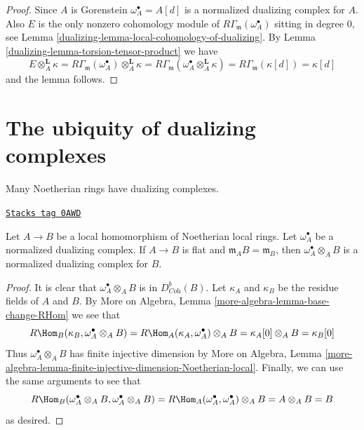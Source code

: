 \begin{proof}

Since $A$ is Gorenstein $\omega_A^\bullet = A[d]$ is a
normalized dualizing complex for $A$.
Also $E$ is the only nonzero cohomology module of
$R\Gamma_\mathfrak m(\omega_A^\bullet)$ sitting in degree $0$, see
Lemma \ref{dualizing-lemma-local-cohomology-of-dualizing}.
By Lemma \ref{dualizing-lemma-torsion-tensor-product} we have
$$
E \otimes_A^\mathbf{L} \kappa =
R\Gamma_\mathfrak m(\omega_A^\bullet) \otimes_A^\mathbf{L} \kappa =
R\Gamma_\mathfrak m(\omega_A^\bullet \otimes_A^\mathbf{L} \kappa) =
R\Gamma_\mathfrak m(\kappa[d]) = \kappa[d]
$$
and the lemma follows.
\end{proof}

\section{The ubiquity of dualizing complexes}
\label{dualizing-section-ubiquity-dualizing}
Many Noetherian rings have dualizing complexes.

\begin{lemma}
\label{dualizing-lemma-flat-unramified}
\href{https://stacks.math.columbia.edu/tag/0AWD}{\texttt{Stacks tag 0AWD}}

Let $A \to B$ be a local homomorphism of Noetherian local rings.
Let $\omega_A^\bullet$ be a normalized dualizing complex.
If $A \to B$ is flat and $\mathfrak m_A B = \mathfrak m_B$,
then $\omega_A^\bullet \otimes_A B$ is a normalized dualizing
complex for $B$.
\end{lemma}

\begin{proof}
It is clear that $\omega_A^\bullet \otimes_A B$ is in $D^b_{\textit{Coh}}(B)$.
Let $\kappa_A$ and $\kappa_B$ be the residue fields of $A$ and $B$.
By More on Algebra, Lemma \ref{more-algebra-lemma-base-change-RHom}
we see that
$$
R\Hom_B(\kappa_B, \omega_A^\bullet \otimes_A B) =
R\Hom_A(\kappa_A, \omega_A^\bullet) \otimes_A B =
\kappa_A[0] \otimes_A B = \kappa_B[0]
$$
Thus $\omega_A^\bullet \otimes_A B$ has finite injective dimension by
More on Algebra, Lemma
\ref{more-algebra-lemma-finite-injective-dimension-Noetherian-local}.
Finally, we can use the same arguments to see that
$$
R\Hom_B(\omega_A^\bullet \otimes_A B, \omega_A^\bullet \otimes_A B) =
R\Hom_A(\omega_A^\bullet, \omega_A^\bullet) \otimes_A B = A \otimes_A B = B
$$
as desired.
\end{proof}

